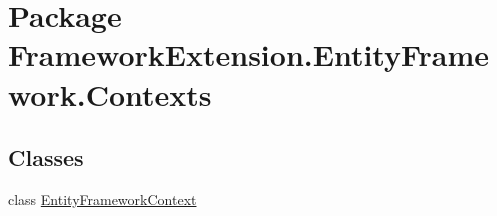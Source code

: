 \hypertarget{namespace_framework_extension_1_1_entity_framework_1_1_contexts}{\section{Package Framework\-Extension.\-Entity\-Framework.\-Contexts}
\label{namespace_framework_extension_1_1_entity_framework_1_1_contexts}
}
\subsection*{Classes}
\begin{DoxyCompactItemize}
\item 
class \hyperlink{class_framework_extension_1_1_entity_framework_1_1_contexts_1_1_entity_framework_context}{Entity\-Framework\-Context}
\end{DoxyCompactItemize}
